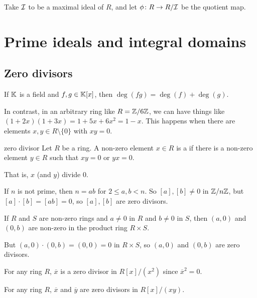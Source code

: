\documentclass[12pt,letterpaper]{report}
\begin{document}
\begin{thmproof}
  Take $\mathcal{I}$ to be a maximal ideal of $R$, and let $\phi \colon R \to R/\mathcal{I}$ be the quotient
  map.
\end{thmproof}

\section{Prime ideals and integral domains}

\subsection{Zero divisors}

If $\mathbb{K}$ is a field and $f, g \in \mathbb{K}[x]$, then $\deg(fg) = \deg(f) + \deg(g)$.

In contrast, in an arbitrary ring like $R = \mathbb{Z}/{6}\mathbb{Z}$, we can have things like
$(1 + 2x)(1 + 3x) = 1 + 5x + 6x^2 = 1 - x$.
This happens when there are elements $x, y \in R \setminus \{0\}$ with $xy = 0$.

\begin{defn}{zero divisor}{}
  Let $R$ be a ring.
  A non-zero element $x \in R$ is a  if there is a non-zero element $y \in R$
  such that $xy = 0$ or $yx = 0$.
\end{defn}

That is, $x$ (and $y$) divide 0.

\begin{ex}
  If $n$ is not prime, then $n = ab$ for $2 \leq a, b < n$.
  So $[a], [b] \neq 0$ in $\mathbb{Z}/{n}\mathbb{Z}$, but $[a] \cdot [b] = [ab] = 0$, so $[a], [b]$ are zero
  divisors.
\end{ex}

\begin{ex}
  If $R$ and $S$ are non-zero rings and $a \neq 0$ in $R$ and $b \neq 0$ in $S$, then
  $(a, 0)$ and $(0, b)$ are non-zero in the product ring $R \times S$.

  But $(a, 0) \cdot (0, b) = (0, 0) = 0$ in $R \times S$, so $(a, 0)$ and $(0, b)$ are zero
  divisors.
\end{ex}

\begin{ex}
  For any ring $R$, $\overline{x}$ is a zero divisor in $R[x]/(x^2)$ since $\overline{x}^2 = 0$.
\end{ex}

\begin{ex}
  For any ring $R$, $\overline{x}$ and $\overline{y}$ are zero divisors in $R[x]/(xy)$.
\end{ex}
\end{document}
